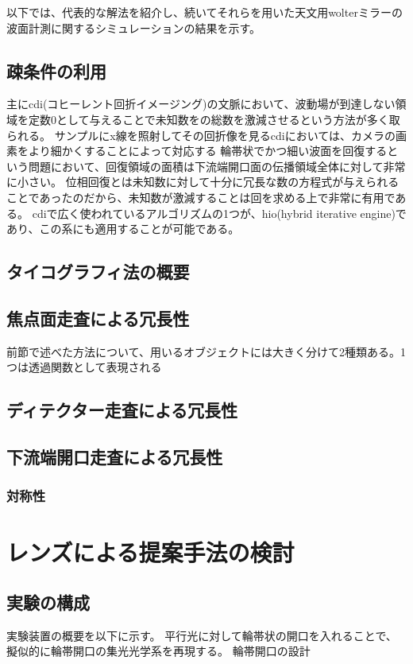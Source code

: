 \documentclass[dvipdfmx,autodetect-engine]{jreport}
\begin{document}
以下では、代表的な解法を紹介し、続いてそれらを用いた天文用wolterミラーの波面計測に関するシミュレーションの結果を示す。

\section{疎条件の利用}
主にcdi(コヒーレント回折イメージング)の文脈において、波動場が到達しない領域を定数0として与えることで未知数をの総数を激減させるという方法が多く取られる。
サンプルにx線を照射してその回折像を見るcdiにおいては、カメラの画素をより細かくすることによって対応する
輪帯状でかつ細い波面を回復するという問題において、回復領域の面積は下流端開口面の伝播領域全体に対して非常に小さい。
位相回復とは未知数に対して十分に冗長な数の方程式が与えられることであったのだから、未知数が激減することは回を求める上で非常に有用である。
cdiで広く使われているアルゴリズムの1つが、hio(hybrid iterative engine)であり、この系にも適用することが可能である。

\section{タイコグラフィ法の概要}

\section{焦点面走査による冗長性}
前節で述べた方法について、用いるオブジェクトには大きく分けて2種類ある。1つは透過関数として表現される


\section{ディテクター走査による冗長性}

\section{下流端開口走査による冗長性}

\subsection{対称性}

\newpage
\chapter{レンズによる提案手法の検討}
\minitoc

\newpage
\section{実験の構成}
実験装置の概要を以下に示す。
平行光に対して輪帯状の開口を入れることで、擬似的に輪帯開口の集光光学系を再現する。
輪帯開口の設計
\end{document}

